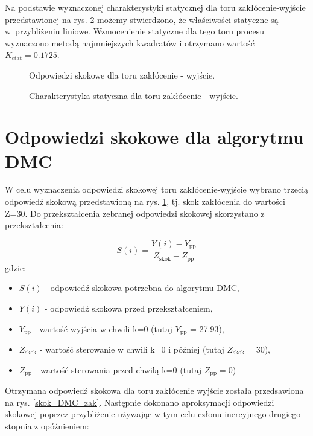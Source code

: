 \documentclass[a4paper,titlepage,11pt,twosides,floatssmall]{mwrep}
\begin{document}
Na podstawie wyznaczonej charakterystyki statycznej dla toru zakłócenie-wyjście przedstawionej na rys. \ref{char_skok_zak} możemy stwierdzono, że właściwości statyczne są w~przybliżeniu liniowe. Wzmocenienie statyczne dla tego toru procesu wyznaczono metodą najmniejszych kwadratów i otrzymano wartość $K_{\mathrm{stat}}=0.1725$.

\begin{figure}[H]
	\centering
	
	\caption{Odpowiedzi skokowe dla toru zakłócenie - wyjście.}
	\label{skok_zak}
\end{figure}

\begin{figure}[H]
	\centering
	
	\caption{Charakterystyka statyczna dla toru zakłócenie - wyjście.}
	\label{char_skok_zak}
\end{figure}

\section{Odpowiedzi skokowe dla algorytmu DMC}
W celu wyznaczenia odpowiedzi skokowej toru zakłócenie-wyjście wybrano trzecią odpowiedź skokową przedstawioną na rys. \ref{skok_zak}, tj. skok zakłócenia do wartości Z=30. Do przekształcenia zebranej odpowiedzi skokowej skorzystano z przekształcenia:

\begin{equation}
	S(i)= \frac{Y(i) - Y_{\mathrm{pp}}}{Z_{\mathrm{skok}} - Z_{\mathrm{pp}}}
\end{equation}
gdzie:
\begin{itemize}
  \item $S(i)$ - odpowiedź skokowa potrzebna do algorytmu DMC,
	\item $Y(i)$ - odpowiedź skokowa przed przekształceniem,
	\item $Y_{\mathrm{pp}}$ - wartość wyjścia w chwili k=0 (tutaj $Y_{\mathrm{pp}}$  = \num{27.93}),
	\item $Z_{\mathrm{skok}}$ - wartość sterowanie w chwili k=0 i później (tutaj $Z_{\mathrm{skok}} = 30$),
	\item $Z_{\mathrm{pp}}$ - wartość sterowania przed chwilą k=0 (tutaj $Z_{\mathrm{pp}} = 0$)
\end{itemize}

Otrzymana odpowiedź skokowa dla toru zakłócenie wyjście została przedsawiona na rys. \ref{skok_DMC_zak}. Następnie dokonano aproksymacji odpowiedzi skokowej poprzez przybliżenie używając w tym celu członu inercyjnego drugiego stopnia z opóźnieniem:
\end{document}
